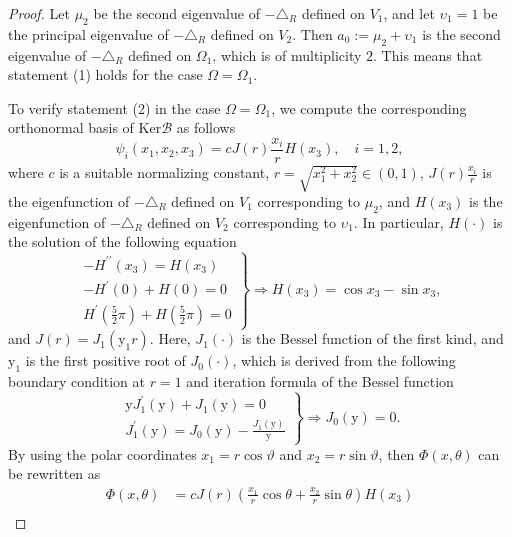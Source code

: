 \documentclass{elsarticle}
\begin{document}
\begin{proof}
Let $\mu_2$ be the second eigenvalue of $-\triangle_R$ defined on $V_1$, and let $\upsilon_1 = 1$ be the principal eigenvalue of $-\triangle_R$ defined on $V_2$. Then $a_0 := \mu_2 + \upsilon_1$ is the second eigenvalue of $-\triangle_R$ defined on $\Omega_1$, which is of multiplicity $2$. This means that statement (1) holds for the case $\Omega =\Omega_1$. 

To verify statement (2) in the case $\Omega =\Omega_1$, we compute the corresponding orthonormal basis of $\mathrm{Ker}\mathcal{B}$ as follows
\begin{equation} \label{explicit_eigenfunctions}
	\psi_i(x_1, x_2, x_3) = cJ(r)\frac{x_i}{r}H(x_3), \quad i=1,2,
\end{equation}
where $c$ is a suitable normalizing constant, $r= \sqrt{x_1^2 + x_2^2}\in(0, 1)$, $J(r)\frac{x_i}{r}$ is the eigenfunction of $-\triangle_R$ defined on $V_1$  corresponding to $\mu_2$, and $H(x_3)$ is the eigenfunction of $-\triangle_R$ defined on $V_2$ corresponding to $\upsilon_1$. In particular, $H(\cdot)$ is the solution of the following equation
\begin{equation}\label{eigenfunceion_3dim}
\left.
\begin{array}{c}
-H^{\prime\prime}(x_3) =   H(x_3)\\
-H^{\prime}(0) + H(0) = 0\\
H^{\prime}(\frac{5}{2}\pi) + H(\frac{5}{2}\pi) = 0
\end{array}
\right\}
\Longrightarrow
H(x_3) = \cos x_3- \sin x_3,
\end{equation}
and $J(r) = J_1(\mathrm{y}_{1}r)$. Here, $J_1(\cdot)$ is the Bessel function of the first kind, and $\mathrm{y}_1$ is the first positive root of $J_0(\cdot)$, which is derived from the following boundary condition at $r=1$ and iteration formula of the Bessel function
\[
\left.
\begin{array}{c}
\mathrm{y}J^{\prime}_1(\mathrm{y}) + J_1(\mathrm{y}) = 0\\
J^{\prime}_1(\mathrm{y}) = J_0(\mathrm{y}) - \frac{J_1(\mathrm{y})}{\mathrm{y}}
\end{array}
\right\}
\Longrightarrow
J_0(\mathrm{y}) = 0.
\]
By using the polar coordinates $x_1 = r\cos\vartheta$ and $x_2 = r\sin\vartheta$, then $\Phi(x, \theta)$ can be rewritten as
\begin{equation*}
\begin{split}
\Phi(x, \theta) &= cJ(r)\left( \frac{x_1}{r} \cos\theta + \frac{x_2}{r}\sin\theta \right)  H(x_3)\\

\end{split}
\end{equation*}
\end{proof}
\end{document}
